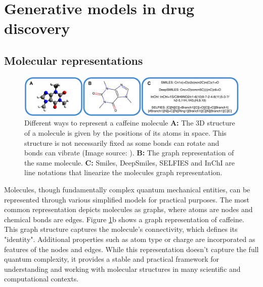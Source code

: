 \section{Generative models in drug discovery}
\subsection{Molecular representations}
\begin{figure}
      \centering
      \includegraphics[width=\textwidth]{figures/representations/representations.pdf}
      \caption{Different ways to represent a caffeine molecule \textbf{A:}  The 3D structure of a
            molecule is given by the positions of its atoms in space. This structure is not
            necessarily fixed as some bonds can rotate and bonds can vibrate (Image source:
            \citep{EnglishCaffeine3D2010}). \textbf{B:} The graph representation of the same
            molecule. \textbf{C:} Smiles, DeepSmiles, SELFIES and InChI are line notations that
            linearize the molecules graph representation.\label{fig:molecular-graph}}
\end{figure}
Molecules, though fundamentally complex quantum mechanical entities, can be represented through
various simplified models for practical purposes. The most common representation depicts molecules
as graphs, where atoms are nodes and chemical bonds are edges. Figure \ref{fig:molecular-graph}b
shows a graph representation of caffeine. This graph structure captures the molecule's connectivity,
which defines its "identity". Additional properties such as atom type or charge are
incorporated as features of the nodes and edges. While this representation doesn't capture the full
quantum complexity, it provides a stable and practical framework for understanding and working with
molecular structures in many scientific and computational contexts.

